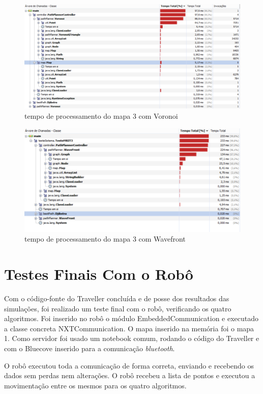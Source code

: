 \begin{figure}[h]
	\centering
	\label{fig49}
		\includegraphics[keepaspectratio=true,scale=0.6]{figuras/voronoi3.PNG}
	\caption{tempo de processamento do mapa 3 com Voronoi}
\end{figure}

\begin{figure}[h]
	\centering
	\label{fig50}
		\includegraphics[keepaspectratio=true,scale=0.6]{figuras/wave3.PNG}
	\caption{tempo de processamento do mapa 3 com Wavefront}
\end{figure}

\section{Testes Finais Com o Robô}

Com o código-fonte do Traveller concluída e de posse dos resultados das simulações, foi realizado um teste final com o robô, verificando os quatro algoritmos. Foi inserido no robô o módulo EmbeddedCommunication e executado a classe concreta NXTCommunication. O mapa inserido na memória foi o mapa 1. Como servidor foi usado um notebook comum, rodando o código do Traveller e com o Bluecove inserido para a comunicação \textit{bluetooth}. 

O robô executou toda a comunicação de forma correta, enviando e recebendo os dados sem perdas nem alterações. O robô recebeu a lista de pontos e executou a movimentação entre os mesmos para os quatro algoritmos.

